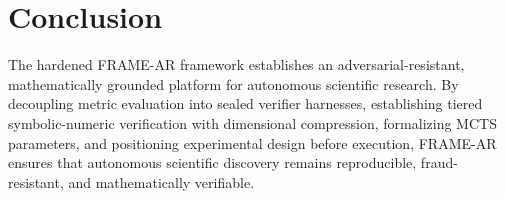 \documentclass[11pt,a4paper]{article}
\begin{document}
\section{Conclusion}
The hardened FRAME-AR framework establishes an adversarial-resistant, mathematically grounded platform for autonomous scientific research. By decoupling metric evaluation into sealed verifier harnesses, establishing tiered symbolic-numeric verification with dimensional compression, formalizing MCTS parameters, and positioning experimental design before execution, FRAME-AR ensures that autonomous scientific discovery remains reproducible, fraud-resistant, and mathematically verifiable.
\end{document}
